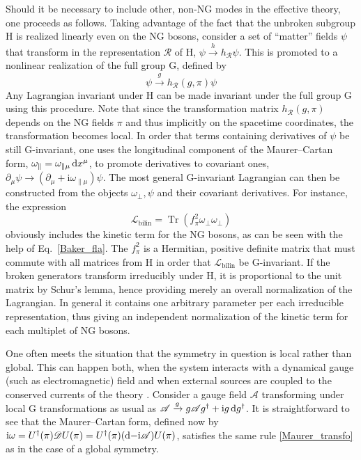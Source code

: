 \documentclass[final,3p,times,12pt,a4paper,sort&compress]{elsarticle}
\newcommand\gr[1]{\mathrm{#1}}              %
\newcommand\Lag{\mathscr{L}}                %
\newcommand\DD{\mathscr{D}}                 %
\newcommand\RR{\mathscr{R}}                 %
\newcommand\AAA{\mathscr{A}}                %
\newcommand\he[1]{#1^{\dagger}}             %
\newcommand\imag{\mathrm i}                 %
\newcommand\de{\partial}
\newcommand\dd{\mathop{{\rm d}\!}\nolimits} %
\DeclareMathOperator{\Tr}{Tr}
\begin{document}
Should it be necessary to include other, non-NG modes in the effective theory,
one proceeds as follows. Taking advantage of the fact that the unbroken
subgroup $\gr H$ is realized linearly even on the NG bosons, consider a set of
``matter'' fields $\psi$ that transform in the representation $\RR$ of $\gr H$,
$\psi\xrightarrow{h}h_\RR\psi$. This is promoted to a nonlinear realization of
the full group $\gr G$, defined by
\begin{equation}
\psi\xrightarrow{g}h_\RR(g,\pi)\psi
\end{equation}
Any Lagrangian invariant under $\gr H$ can be made invariant under the full
group $\gr G$ using this procedure. Note that since the transformation matrix
$h_\RR(g,\pi)$ depends on the NG fields $\pi$ and thus implicitly on the
spacetime coordinates, the transformation becomes local. In order that terms
containing derivatives of $\psi$ be still $\gr G$-invariant, one uses the
longitudinal component of the Maurer--Cartan form,
$\omega_\parallel=\omega_{\parallel\mu}\dd x^\mu$, to promote derivatives to
covariant ones, $\de_\mu\psi\to(\de_\mu+\imag\omega_{\parallel\mu})\psi$. The
most general $\gr G$-invariant Lagrangian can then be constructed
\cite{Burgess:1998ku} from the objects $\omega_\perp,\psi$ and their covariant
derivatives. For instance, the expression
\begin{equation}
\Lag_{\text{bilin}}=\Tr(f_\pi^2\omega_\perp\omega_\perp)
\label{coset_kinterm}
\end{equation}
obviously includes the kinetic term for the NG bosons, as can be seen with the
help of Eq.~\eqref{Baker_fla}. The $f_\pi^2$ is a Hermitian, positive definite
matrix that must commute with all matrices from $\gr H$ in order that
$\Lag_{\text{bilin}}$ be $\gr G$-invariant. If the broken generators transform
irreducibly under $\gr H$, it is proportional to the unit matrix by Schur's
lemma, hence providing merely an overall normalization of the Lagrangian. In
general it contains one arbitrary parameter per each irreducible
representation, thus giving an independent normalization of the kinetic term for
each multiplet of NG bosons.

One often meets the situation that the symmetry in question is local rather
than global. This can happen both, when the system interacts with a dynamical
gauge (such as electromagnetic) field and when external sources are coupled to
the conserved currents of the theory \cite{Leutwyler:1993iq}. Consider a gauge
field $\AAA$ transforming under local $\gr G$ transformations as usual as
$\AAA\xrightarrow{g}g\AAA\he g+\imag g\dd\he g$. It is straightforward to see
that the Maurer--Cartan form, defined now by $\imag\omega=\he U(\pi)\DD
U(\pi)=\he U(\pi)(\dd-\imag\AAA)U(\pi)$, satisfies the same rule
\eqref{Maurer_transfo} as in the case of a global symmetry.
\end{document}
